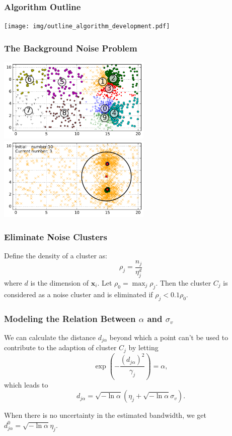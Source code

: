 \documentclass{beamer}
\begin{document}
\begin{frame}
  \frametitle{Algorithm Outline}
  \texttt{[image: img/outline\_algorithm\_development.pdf]}
\end{frame}


\begin{frame}
  \frametitle{The Background Noise Problem}
  \begin{center}
    \includegraphics[height=4cm]{img/noise_cluster_problem_ini.png} \\
    \includegraphics[height=4cm]{img/noise_cluster_problem_last_frame.png}
  \end{center}
\end{frame}

\begin{frame}
  \frametitle{Eliminate Noise Clusters}
  Define the density of a cluster as:
  \begin{equation}
    \label{npcm_density}
    \rho_j=\frac{n_j}{\eta_j^d}
  \end{equation}
  where $d$ is the dimension of $\mathbf{x}_i$. Let
  $\rho_0=\max_j\rho_j$. Then the cluster $C_j$ is considered as a
  noise cluster and is eliminated if $\rho_j<0.1\rho_0$.
\end{frame}


\begin{frame}
  \frametitle{Modeling the Relation Between $\alpha$ and $\sigma_v$}
  We can calculate the distance $d_{j\alpha}$ beyond which a point
  can't be used to contribute to the adaption of cluster $C_j$ by
  letting
  \begin{equation}
    \exp\left(-\frac{(d_{j\alpha})^2}{\gamma_j}\right)=\alpha,
  \end{equation}
  which leads to
  \begin{equation}
    \label{npcm_d_alpha}
    d_{j\alpha}=\sqrt{-\ln\alpha}\left(\eta_j+\sqrt{-\ln\alpha}\sigma_v\right).
  \end{equation}

  When there is no uncertainty in the estimated bandwidth, we get
  $d_{j\alpha}^0=\sqrt{-\ln\alpha}\eta_j$.
\end{frame}
\end{document}
